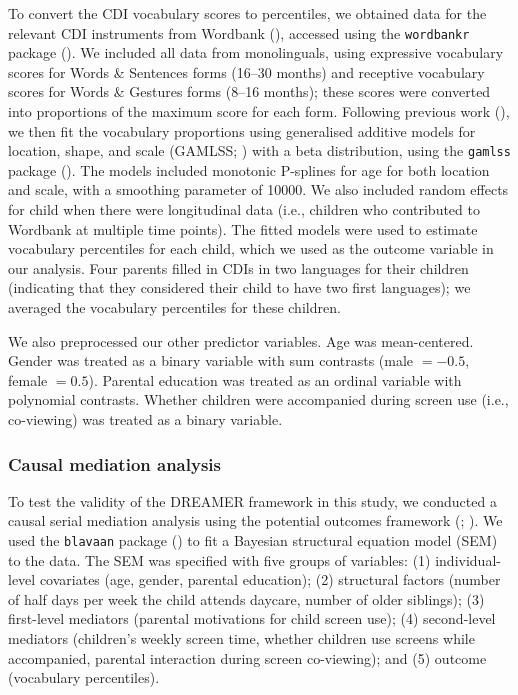 \documentclass[
  man,
  floatsintext,
  longtable,
  nolmodern,
  notxfonts,
  notimes,
  colorlinks=true,linkcolor=blue,citecolor=blue,urlcolor=blue]{apa7}
\begin{document}
To convert the CDI vocabulary scores to percentiles, we obtained data
for the relevant CDI instruments from Wordbank
(),
accessed using the \texttt{wordbankr} package
(). We included all data from monolinguals, using expressive
vocabulary scores for Words \& Sentences forms (16--30 months) and
receptive vocabulary scores for Words \& Gestures forms (8--16 months);
these scores were converted into proportions of the maximum score for
each form. Following previous work
(), we then fit the vocabulary proportions using generalised
additive models for location, shape, and scale (GAMLSS;
) with a beta distribution, using the \texttt{gamlss}
package
(). The models included monotonic P-splines for age for both
location and scale, with a smoothing parameter of 10000. We also
included random effects for child when there were longitudinal data
(i.e., children who contributed to Wordbank at multiple time points).
The fitted models were used to estimate vocabulary percentiles for each
child, which we used as the outcome variable in our analysis. Four
parents filled in CDIs in two languages for their children (indicating
that they considered their child to have two first languages); we
averaged the vocabulary percentiles for these children.

We also preprocessed our other predictor variables. Age was
mean-centered. Gender was treated as a binary variable with sum
contrasts (male \(= - 0.5\), female \(= 0.5\)). Parental education was
treated as an ordinal variable with polynomial contrasts. Whether
children were accompanied during screen use (i.e., co-viewing) was
treated as a binary variable.

\subsubsection{Causal mediation
analysis}\label{causal-mediation-analysis}

To test the validity of the DREAMER framework in this study, we
conducted a causal serial mediation analysis using the potential
outcomes framework (; ). We used the \texttt{blavaan} package
() to fit a Bayesian structural equation model (SEM) to the data.
The SEM was specified with five groups of variables: (1)
individual-level covariates (age, gender, parental education); (2)
structural factors (number of half days per week the child attends
daycare, number of older siblings); (3) first-level mediators (parental
motivations for child screen use); (4) second-level mediators
(children's weekly screen time, whether children use screens while
accompanied, parental interaction during screen co-viewing); and (5)
outcome (vocabulary percentiles).
\end{document}
